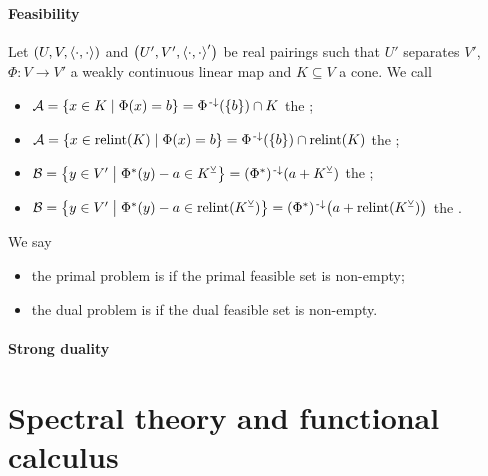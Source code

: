 \subsubsection{Feasibility}
\begin{definition}
Let $\sSet{U,V,\pair{\cdot,\cdot}}$ and $\sSet{U',V',\pair{\cdot,\cdot}'}$ be real pairings such that $U'$ separates $V'$, $\Phi: V\to V'$ a weakly continuous linear map and $K\subseteq V$ a cone. We call
\begin{itemize}
\item $\mathcal{A} = \setbuilder{x\in K}{\Phi(x) = b} = \Phi^{\preimf}(\{b\})\cap K$ the ;
\item $\mathcal{A} = \setbuilder{x\in \relint(K)}{\Phi(x) = b} = \Phi^{\preimf}(\{b\})\cap \relint(K)$ the ;
\item $\mathcal{B} = \setbuilder{y\in V'}{\Phi^*(y) -a\in K^\pairingAligned} = (\Phi^*)^{\preimf}(a+K^\pairingAligned)$ the ;
\item $\mathcal{B} = \setbuilder{y\in V'}{\Phi^*(y) -a\in \relint(K^\pairingAligned)} = (\Phi^*)^{\preimf}\big(a+\relint(K^\pairingAligned)\big)$ the .
\end{itemize}
We say
\begin{itemize}
\item the primal problem is  if the primal feasible set is non-empty;
\item the dual problem is  if the dual feasible set is non-empty.
\end{itemize}
\end{definition}

\subsubsection{Strong duality}
\begin{theorem}

\end{theorem}

\chapter{Spectral theory and functional calculus}
